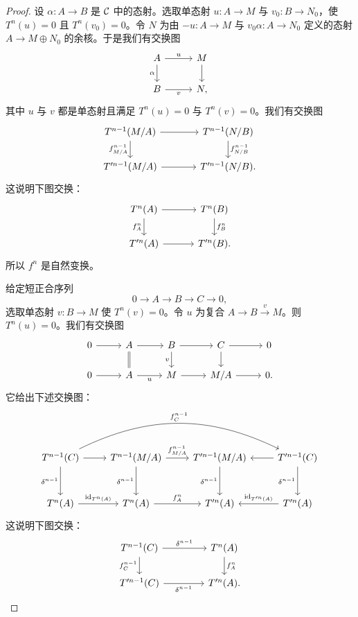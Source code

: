 \begin{proof}
设 $\alpha\colon A\to B$ 是 $\mathcal{C}$ 中的态射。选取单态射 $u\colon A\to M$ 与 $v_0\colon B\to N_0$，使 $T^n(u)=0$ 且 $T^n(v_0)=0$。令 $N$ 为由 $-u\colon A\to M$ 与 $v_0\alpha\colon A\to N_0$ 定义的态射 $A\to M\oplus N_0$ 的余核。于是我们有交换图
\[\begin{tikzcd}[column sep=2.8em,row sep=1.8em]
A \arrow[r,"u"] \arrow[d,"\alpha"'] & M \arrow[d] \\
B \arrow[r,"v"'] & N,
\end{tikzcd}\]
其中 $u$ 与 $v$ 都是单态射且满足 $T^n(u)=0$ 与 $T^n(v)=0$。我们有交换图
\[\begin{tikzcd}[column sep=3.6em,row sep=1.8em]
T^{n-1}(M/A) \arrow[r] \arrow[d,"f^{n-1}_{M/A}"'] & T^{n-1}(N/B) \arrow[d,"f^{n-1}_{N/B}"] \\
T'^{n-1}(M/A) \arrow[r] & T'^{n-1}(N/B).
\end{tikzcd}\]
这说明下图交换：
\[\begin{tikzcd}[column sep=3.2em,row sep=1.8em]
T^n(A) \arrow[r] \arrow[d,"f^n_A"'] & T^n(B) \arrow[d,"f^n_B"] \\
T'^n(A) \arrow[r] & T'^n(B).
\end{tikzcd}\]
所以 $f^n$ 是自然变换。

给定短正合序列
\[
0\to A\to B\to C\to 0,
\]
选取单态射 $v\colon B\to M$ 使 $T^n(v)=0$。令 $u$ 为复合 $A\to B\xrightarrow{v}M$。则 $T^n(u)=0$。我们有交换图
\[\begin{tikzcd}[column sep=2.6em,row sep=1.6em]
0 \arrow[r] & A \arrow[r] \arrow[d,equal] & B \arrow[r] \arrow[d,"v"'] & C \arrow[r] \arrow[d] & 0 \\
0 \arrow[r] & A \arrow[r,"u"'] & M \arrow[r] & M/A \arrow[r] & 0.
\end{tikzcd}\]
它给出下述交换图：
\[\begin{tikzcd}[column sep=2.4em,row sep=3.0em]
T^{n-1}(C) \arrow[r] \arrow[d,"\delta^{n-1}"'] \arrow[rrr,bend left=26,"f^{n-1}_C"]
  & T^{n-1}(M/A) \arrow[r,"f^{n-1}_{M/A}"] \arrow[d,"\delta^{n-1}"']
  & T'^{n-1}(M/A) \arrow[d,"\delta^{n-1}"']
  & T'^{n-1}(C) \arrow[l] \arrow[d,"\delta^{n-1}"'] \\
T^n(A) \arrow[r,"\id_{T^n(A)}"]
  & T^n(A) \arrow[r,"f^n_A"]
  & T'^n(A)
  & T'^n(A) \arrow[l,"\id_{T'^n(A)}"']
\end{tikzcd}\]
这说明下图交换：
\[\begin{tikzcd}[column sep=4.2em,row sep=1.8em]
T^{n-1}(C) \arrow[r,"\delta^{n-1}"] \arrow[d,"f^{n-1}_C"'] & T^n(A) \arrow[d,"f^n_A"] \\
T'^{n-1}(C) \arrow[r,"\delta^{n-1}"'] & T'^n(A).
\end{tikzcd}\]
\end{proof}

